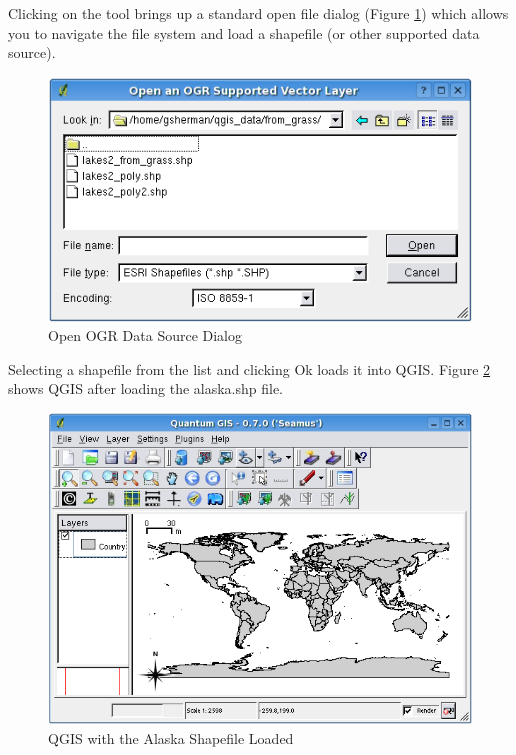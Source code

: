 \documentclass[10pt,english]{article}
\begin{document}
\begin{onehalfspace}
Clicking on the tool brings up a standard open file dialog (Figure \ref{fig:openshapefile}) which allows you to navigate the file system and load a shapefile (or other supported data source). 
\begin{figure}[h]
   \begin{center}
   \caption{Open OGR Data Source Dialog}\label{fig:openshapefile}\smallskip
   \includegraphics[scale=.75]{qgis_user_guide_images/shapefileopendialog}
\end{center}  
   
\end{figure}
Selecting a shapefile from the list and clicking Ok loads it into QGIS. Figure \ref{fig:loadedshapefile}
shows QGIS after loading the alaska.shp file.
\begin{figure}[h]
   \begin{center}
   \caption{QGIS with the Alaska Shapefile Loaded}\label{fig:loadedshapefile}\smallskip
   \includegraphics[scale=.6]{qgis_user_guide_images/shapefileloaded}
\end{center}  
   

\end{figure}
\end{onehalfspace}
\end{document}

